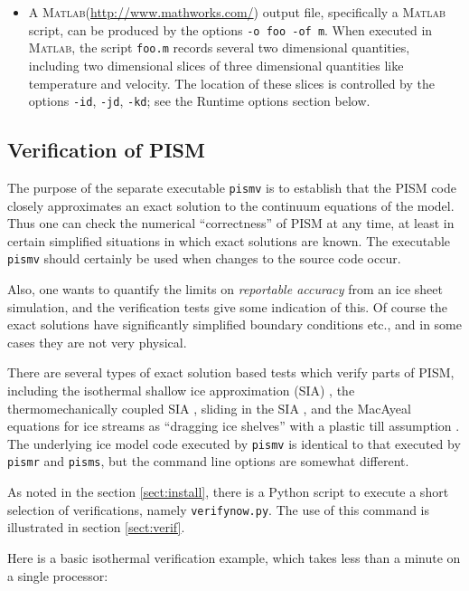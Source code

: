 \documentclass[11pt,final]{amsart}
\renewcommand{\t}[1]{\texttt{#1}}
\newcommand{\Matlab}{\textsc{Matlab}\xspace}
\begin{document}
\begin{itemize}
\item A \Matlab (\url{http://www.mathworks.com/}) output file, specifically a \Matlab script, can be produced by the options \verb|-o foo -of m|.  When executed in \Matlab, the script \verb|foo.m| records several two dimensional quantities, including two dimensional slices of three dimensional quantities like temperature and velocity.  The location of these slices is controlled by the options \verb|-id|, \verb|-jd|, \verb|-kd|; see the Runtime options section below.
\end{itemize}


\subsection{Verification of PISM}  The purpose of the separate executable \t{pismv} is to establish that the PISM code closely approximates an exact solution to the continuum equations of the model.  Thus one can check the numerical ``correctness'' of PISM at any time, at least in certain simplified situations in which exact solutions are known.  The executable \t{pismv} should certainly be used when changes to the source code occur.

Also, one wants to quantify the limits on \emph{reportable accuracy} from an ice sheet simulation, and the verification tests give some indication of this.  Of course the exact solutions have significantly simplified boundary conditions etc., and in some cases they are not very physical.

There are several types of exact solution based tests which verify parts of PISM, including the isothermal shallow ice approximation (SIA) \cite{BLKCB}, the thermomechanically coupled SIA \cite{BBL,BB}, sliding in the SIA \cite{BLKCB}, and the MacAyeal equations for ice streams as ``dragging ice shelves'' \cite{MacAyeal} with a plastic till assumption \cite{SchoofStream}.  The underlying ice model code executed by \t{pismv} is identical to that executed by \verb|pismr| and \verb|pisms|, but the command line options are somewhat different.

As noted in the section \ref{sect:install}, there is a Python script to execute a short selection of verifications, namely \t{verifynow.py}.  The use of this command is illustrated in section \ref{sect:verif}.

Here is a basic isothermal verification example, which takes less than a minute on a single processor:
\end{document}
